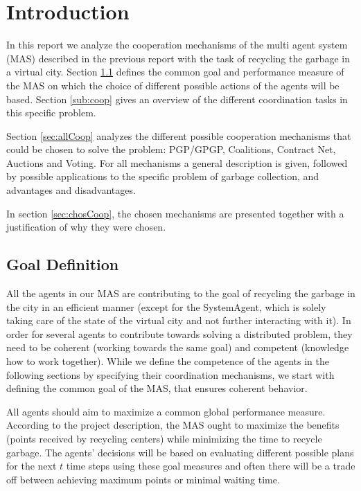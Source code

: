 \section{Introduction}

In this report we analyze the cooperation mechanisms of the multi agent system (MAS) described in the previous report with the task of recycling the garbage in a virtual city. Section \ref{sub:goal} defines the common goal and performance measure of the MAS on which the choice of different possible actions of the agents will be based. Section \ref{sub:coop} gives an overview of the different coordination tasks in this specific problem.

Section \ref{sec:allCoop} analyzes the different possible cooperation mechanisms that could be chosen to solve the problem: PGP/GPGP, Coalitions, Contract Net, Auctions and Voting. For all mechanisms a general description is given, followed by possible applications to the specific problem of garbage collection, and advantages and disadvantages.

In section \ref{sec:chosCoop}, the chosen mechanisms are presented together with a justification of why they were chosen.

\subsection{Goal Definition}
\label{sub:goal}

All the agents in our MAS are contributing to the goal of recycling the garbage in the city in an efficient manner (except for the SystemAgent, which is solely taking care of the state of the virtual city and not further interacting with it). In order for several agents to contribute towards solving a distributed problem, they need to be coherent (working towards the same goal) and competent (knowledge how to work together). While we define the competence of the agents in the following sections by specifying their coordination mechanisms, we start with defining the common goal of the MAS, that ensures coherent behavior. 

All agents should aim to maximize a common global performance measure. According to the project description, the MAS ought to maximize the benefits (points received by recycling centers) while minimizing the time to recycle garbage. The agents' decisions will be based on evaluating different possible plans for the next $t$ time steps using these goal measures and often there will be a trade off between achieving maximum points or minimal waiting time. 

